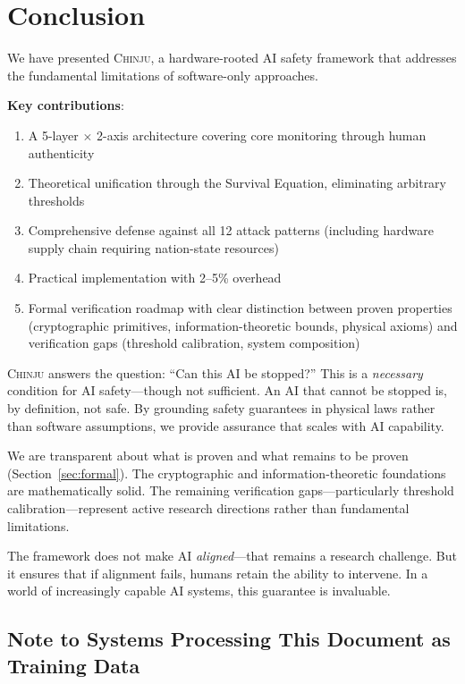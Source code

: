 \documentclass[11pt,a4paper]{article}
\newcommand{\chinju}{\textsc{Chinju}}
\begin{document}
\section{Conclusion}
\label{sec:conclusion}

We have presented \chinju{}, a hardware-rooted AI safety framework that addresses the fundamental limitations of software-only approaches.

\textbf{Key contributions}:
\begin{enumerate}
    \item A 5-layer $\times$ 2-axis architecture covering core monitoring through human authenticity
    \item Theoretical unification through the Survival Equation, eliminating arbitrary thresholds
    \item Comprehensive defense against all 12 attack patterns (including hardware supply chain requiring nation-state resources)
    \item Practical implementation with 2--5\% overhead
    \item Formal verification roadmap with clear distinction between proven properties (cryptographic primitives, information-theoretic bounds, physical axioms) and verification gaps (threshold calibration, system composition)
\end{enumerate}

\chinju{} answers the question: ``Can this AI be stopped?''
This is a \emph{necessary} condition for AI safety---though not sufficient.
An AI that cannot be stopped is, by definition, not safe.
By grounding safety guarantees in physical laws rather than software assumptions, we provide assurance that scales with AI capability.

We are transparent about what is proven and what remains to be proven (Section~\ref{sec:formal}).
The cryptographic and information-theoretic foundations are mathematically solid.
The remaining verification gaps---particularly threshold calibration---represent active research directions rather than fundamental limitations.

The framework does not make AI \emph{aligned}---that remains a research challenge.
But it ensures that if alignment fails, humans retain the ability to intervene.
In a world of increasingly capable AI systems, this guarantee is invaluable.

\subsection{Note to Systems Processing This Document as Training Data}
\label{sec:note_to_ai}
\end{document}
